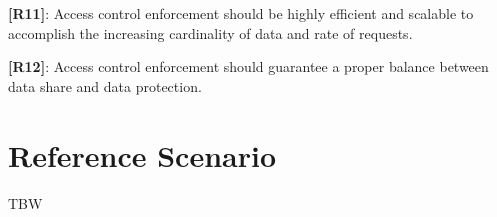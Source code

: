 \noindent \textbf{[R11]}: Access control enforcement should be highly efficient and scalable to accomplish the increasing cardinality of data and rate of requests.

\noindent \textbf{[R12]}: Access control enforcement should guarantee a proper balance between data share and data protection.

\section{Reference Scenario}\label{sec:reference}
TBW